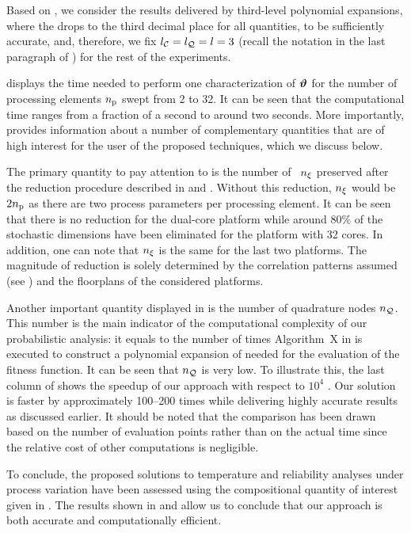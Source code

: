 Based on , we consider the results delivered by third-level polynomial expansions, where the  drops to the third decimal place for all quantities, to be sufficiently accurate, and, therefore, we fix ${l_\mathcal{C}} = {l_\mathcal{Q}} = l = 3$ (recall the notation in the last paragraph of ) for the rest of the experiments.


 displays the time needed to perform one characterization of $\bm{\vartheta}$ for the number of processing elements ${n_\text{p}}$ swept from 2 to 32.
It can be seen that the computational time ranges from a fraction of a second to around two seconds.
More importantly,  provides information about a number of complementary quantities that are of high interest for the user of the proposed techniques, which we discuss below.

The primary quantity to pay attention to is the number of \rvs\ ${n_\xi}$ preserved after the reduction procedure described in  and .
Without this reduction, ${n_\xi}$ would be $2 {n_\text{p}}$ as there are two process parameters per processing element.
It can be seen that there is no reduction for the dual-core platform while around 80\% of the stochastic dimensions have been eliminated for the platform with 32 cores.
In addition, one can note that ${n_\xi}$ is the same for the last two platforms.
The magnitude of reduction is solely determined by the correlation patterns assumed (see ) and the floorplans of the considered platforms.

Another important quantity displayed in  is the number of quadrature nodes ${n_\mathcal{Q}}$.
This number is the main indicator of the computational complexity of our probabilistic analysis: it equals to the number of times Algorithm~X in  is executed to construct a polynomial expansion of  needed for the evaluation of the fitness function.
It can be seen that ${n_\mathcal{Q}}$ is very low.
To illustrate this, the last column of  shows the speedup of our approach with respect to $10^4$ \MC.
Our solution is faster by approximately 100--200 times while delivering highly accurate results as discussed earlier.
It should be noted that the comparison has been drawn based on the number of evaluation points rather than on the actual time since the relative cost of other computations is negligible.

To conclude, the proposed solutions to temperature and reliability analyses under process variation have been assessed using the compositional quantity of interest given in .
The results shown in  and  allow us to conclude that our approach is both accurate and computationally efficient.
